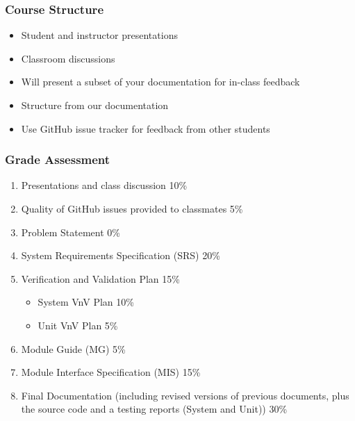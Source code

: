 \documentclass[t,12pt,numbers,fleqn]{beamer}
\begin{document}

\begin{frame}
\frametitle{Course Structure}

\begin {itemize}

\item Student and instructor presentations
\item Classroom discussions
\item Will present a subset of your documentation for in-class feedback
\item Structure from our documentation
\item Use GitHub issue tracker for feedback from other students

\end {itemize}

\end{frame}


\begin{frame}
\frametitle{Grade Assessment}

\begin {enumerate}

\item Presentations and class discussion 10\%

\item Quality of GitHub issues provided to classmates 5\%

\item Problem Statement 0\%

\item System Requirements Specification (SRS) 20\%

\item Verification and Validation Plan 15\%
\begin{itemize}
\item System VnV Plan 10\%
\item Unit VnV Plan 5\%
\end{itemize}

\item Module Guide (MG) 5\%

\item Module Interface Specification (MIS) 15\%

\item Final Documentation (including revised versions of previous documents,
  plus the source code and a testing reports (System and Unit)) 30\%

\end {enumerate}

\end{frame}
\end{document}
